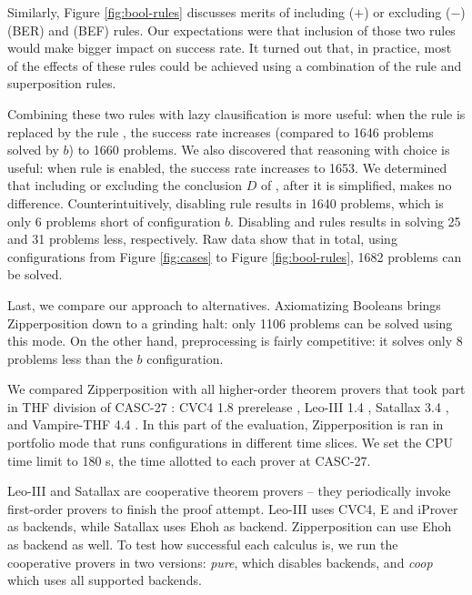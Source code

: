 Similarly, Figure \ref{fig:bool-rules} discusses merits of including ($+$) or
excluding ($-$)  (BER) and  (BEF) rules. Our
expectations were that inclusion of those two rules would make bigger impact on
success rate. It turned out that, in practice, most of the effects of these
rules could be achieved using a combination of the  rule and
superposition rules.
\pagebreak[2]

Combining these two rules with lazy clausification is more useful: when the rule
 is replaced by the rule , the success rate increases
(compared to 1646 problems solved by $b$) to 1660 problems. We also discovered
that reasoning with choice is useful: when rule  is enabled, the
success rate increases to 1653. We determined that including or excluding the
conclusion $D$ of , after it is simplified, makes no difference.
Counterintuitively, disabling  rule results in 1640 problems,
which is only 6 problems short of configuration $b$. Disabling  and
 rules results in solving 25 and 31 problems less,
respectively. Raw data show that in total, using configurations from Figure
\ref{fig:cases} to Figure \ref{fig:bool-rules}, 1682 problems can be solved.

Last, we compare our approach to alternatives. Axiomatizing Booleans brings
Zipperposition down to a grinding halt: only 1106 problems can be solved using
this mode. On the other hand, preprocessing is fairly competitive: it solves
only 8 problems less than the $b$ configuration.



We compared Zipperposition with all higher-order theorem provers that took part
in THF division of CASC-27 \cite{gs-19-casc27}: CVC4 1.8 prerelease \cite{cbetal-11-cvc4},
Leo-III 1.4 \cite{sb-21-leo3}, Satallax 3.4
\cite{cb-12-satallax}, and Vampire-THF 4.4
\cite{lkav-13-vampire}. In this part of the evaluation, Zipperposition is ran
in portfolio mode that runs configurations in different time slices. 
We set the CPU time limit to 180 s, the time allotted to each prover at CASC-27.


Leo-III and Satallax are cooperative theorem provers -- they periodically invoke
first-order provers to finish the proof attempt. Leo-III uses CVC4, E and
iProver \cite{kk-08-iprover} as backends, while Satallax uses Ehoh
 as backend. Zipperposition can use Ehoh as backend as well. To test how successful each calculus is, we run
the cooperative provers in two versions: \emph{pure}, which disables backends,
and \emph{coop} which uses all supported backends.



